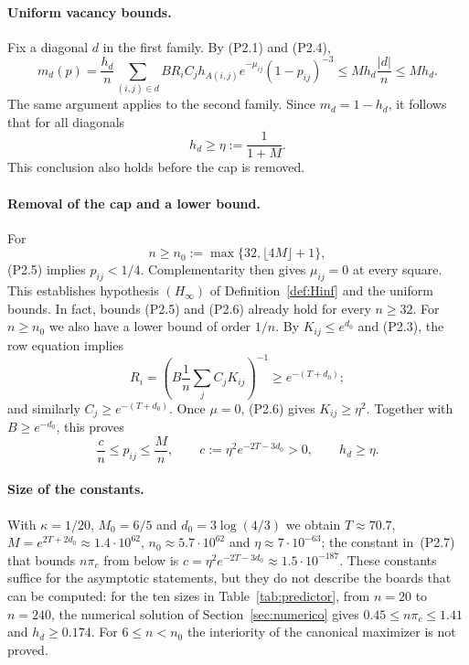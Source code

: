 \paragraph{Uniform vacancy bounds.}
Fix a diagonal $d$ in the first family. By (P2.1) and (P2.4),
\[
 m_d(p)=\frac{h_d}{n}\sum_{(i,j)\in d}
 B R_i C_j h_{A(i,j)}e^{-\mu_{ij}}(1-p_{ij})^{-3}
 \le M h_d\frac{|d|}{n}\le M h_d.
\]
The same argument applies to the second family.
Since $m_d=1-h_d$, it follows that for all diagonals
\[
                 h_d\ge\eta:=\frac1{1+M}.        \tag{P2.6}
\]
This conclusion also holds before the cap is removed.

\paragraph{Removal of the cap and a lower bound.}
For
\[
 n\ge n_0:=\max\{32,\lfloor4M\rfloor+1\},
\]
(P2.5) implies $p_{ij}<1/4$. Complementarity then gives
$\mu_{ij}=0$ at every square.
This establishes hypothesis $(H_\infty)$ of Definition~\ref{def:Hinf} and
the uniform bounds. In fact, bounds (P2.5) and
(P2.6) already hold for every $n\ge32$.
For $n\ge n_0$ we also have a lower bound of order $1/n$.
By $K_{ij}\le e^{d_0}$ and (P2.3), the row equation implies
\[
 R_i=\left(B\frac1n\sum_jC_jK_{ij}\right)^{-1}
       \ge e^{-(T+d_0)};
\]
and similarly $C_j\ge e^{-(T+d_0)}$.
Once $\mu=0$, (P2.6) gives $K_{ij}\ge\eta^2$. Together with
$B\ge e^{-d_0}$, this proves
\[
 \frac{c}{n}\le p_{ij}\le\frac Mn,\qquad
 c:=\eta^2e^{-2T-3d_0}>0,
 \qquad h_d\ge\eta.                              \tag{P2.7}
\]

\paragraph{Size of the constants.}
With $\kappa=1/20$, $M_0=6/5$ and $d_0=3\log(4/3)$ we obtain $T\approx70.7$,
$M=e^{2T+2d_0}\approx1.4\cdot10^{62}$, $n_0\approx5.7\cdot10^{62}$ and
$\eta\approx7\cdot10^{-63}$; the constant in~(P2.7) that bounds $n\pi_c$ from below is
$c=\eta^2e^{-2T-3d_0}\approx1.5\cdot10^{-187}$. These constants suffice for the asymptotic statements,
but they do not describe the boards that can be computed: for the ten sizes in Table~\ref{tab:predictor},
from $n=20$ to $n=240$, the numerical solution of Section~\ref{sec:numerico} gives
$0.45\le n\pi_c\le1.41$ and $h_d\ge0.174$. For $6\le n<n_0$ the interiority of the canonical
maximizer is not proved.
